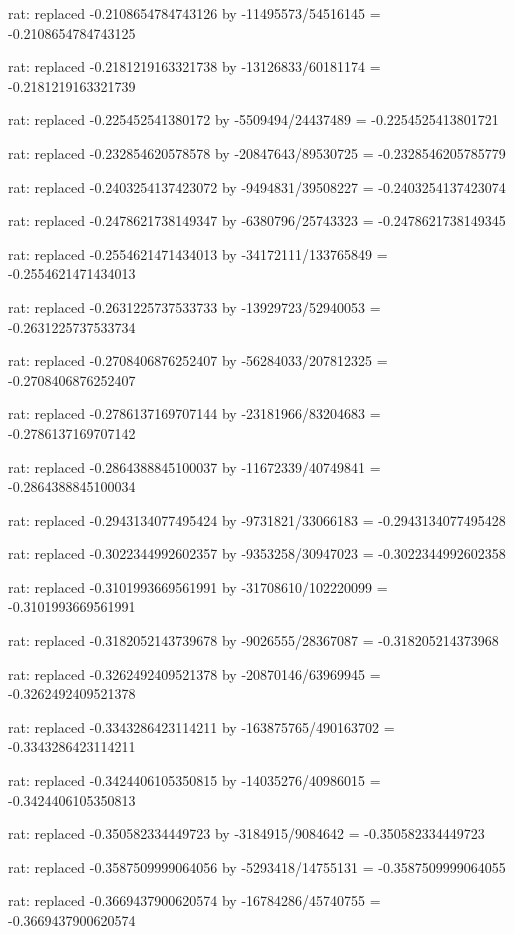 \documentclass[a4paper,10pt]{article}
\begin{document}
\begin{eulernotebook}
\begin{eulercomment}
\begin{eulercomment}
\begin{eulercomment}
\begin{eulercomment}
\begin{eulercomment}
\begin{eulercomment}
\begin{eulercomment}
\begin{eulercomment}
\begin{eulercomment}
\begin{eulercomment}
\begin{eulercomment}
\begin{eulercomment}
\begin{eulercomment}
\begin{eulercomment}
\begin{eulercomment}
\begin{eulercomment}
\begin{euleroutput}
  rat: replaced -0.2108654784743126 by -11495573/54516145 = -0.2108654784743125
  
  rat: replaced -0.2181219163321738 by -13126833/60181174 = -0.2181219163321739
  
  rat: replaced -0.225452541380172 by -5509494/24437489 = -0.2254525413801721
  
  rat: replaced -0.232854620578578 by -20847643/89530725 = -0.2328546205785779
  
  rat: replaced -0.2403254137423072 by -9494831/39508227 = -0.2403254137423074
  
  rat: replaced -0.2478621738149347 by -6380796/25743323 = -0.2478621738149345
  
  rat: replaced -0.2554621471434013 by -34172111/133765849 = -0.2554621471434013
  
  rat: replaced -0.2631225737533733 by -13929723/52940053 = -0.2631225737533734
  
  rat: replaced -0.2708406876252407 by -56284033/207812325 = -0.2708406876252407
  
  rat: replaced -0.2786137169707144 by -23181966/83204683 = -0.2786137169707142
  
  rat: replaced -0.2864388845100037 by -11672339/40749841 = -0.2864388845100034
  
  rat: replaced -0.2943134077495424 by -9731821/33066183 = -0.2943134077495428
  
  rat: replaced -0.3022344992602357 by -9353258/30947023 = -0.3022344992602358
  
  rat: replaced -0.3101993669561991 by -31708610/102220099 = -0.3101993669561991
  
  rat: replaced -0.3182052143739678 by -9026555/28367087 = -0.318205214373968
  
  rat: replaced -0.3262492409521378 by -20870146/63969945 = -0.3262492409521378
  
  rat: replaced -0.3343286423114211 by -163875765/490163702 = -0.3343286423114211
  
  rat: replaced -0.3424406105350815 by -14035276/40986015 = -0.3424406105350813
  
  rat: replaced -0.350582334449723 by -3184915/9084642 = -0.350582334449723
  
  rat: replaced -0.3587509999064056 by -5293418/14755131 = -0.3587509999064055
  
  rat: replaced -0.3669437900620574 by -16784286/45740755 = -0.3669437900620574
  

\end{euleroutput}
\end{eulercomment}
\end{eulercomment}
\end{eulercomment}
\end{eulercomment}
\end{eulercomment}
\end{eulercomment}
\end{eulercomment}
\end{eulercomment}
\end{eulercomment}
\end{eulercomment}
\end{eulercomment}
\end{eulercomment}
\end{eulercomment}
\end{eulercomment}
\end{eulercomment}
\end{eulercomment}
\end{eulernotebook}
\end{document}
